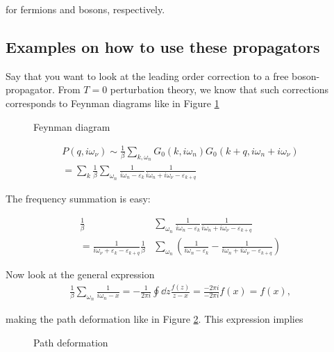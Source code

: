 for fermions and bosons, respectively. 

\subsection[Usage of propagators]{Examples on how to use these propagators}

Say that you want to look at the leading order correction to a free boson-propagator. From $T = 0$ perturbation theory, we know that such corrections corresponds to Feynman diagrams like in Figure \ref{fig:feyn_diag} \\ 


\begin{figure}
	\centering
	
	\caption{Feynman diagram}
	\label{fig:feyn_diag}
\end{figure}


\begin{align*}
    P(q, i\omega_\nu) \sim \frac{1}{\beta}\sum_{k, \omega_n}G_0(k, i\omega_n)G_0(k+q, i\omega_n + i\omega_\nu) \\ = \sum_{k} \frac{1}{\beta} \sum_{\omega_n} \frac{1}{i\omega_n - \varepsilon_k}\frac{1}{i\omega_n + i\omega_\nu - \varepsilon_{k+q}}
\end{align*}

The frequency summation is easy: 

\begin{align*}
    \frac{1}{\beta} &\sum_{\omega_n} \frac{1}{i\omega_n - \varepsilon_k}\frac{1}{i\omega_n + i\omega_\nu - \varepsilon_{k+q}} \\ = \frac{1}{i\omega_\nu + \varepsilon_k - \varepsilon_{k+q}} \frac{1}{\beta}&\sum_{\omega_n}\left(\frac{1}{i\omega_n - \varepsilon_k} - \frac{1}{i\omega_n + i\omega_\nu - \varepsilon_{k+q}} \right)
\end{align*}


Now look at the general expression
\begin{align*}
    \frac{1}{\beta}\sum_{\omega_n} \frac{1}{i\omega_n - x} = -\frac{1}{2\pi i}\oint \dd z \frac{f(z)}{z - x} = \frac{-2\pi i}{-2\pi i} f(x) = f(x),
\end{align*}

making the path deformation like in Figure \ref{fig:poles}. This expression implies

\begin{figure}
	\centering
	
	\caption{Path deformation}
	\label{fig:poles}
\end{figure}


